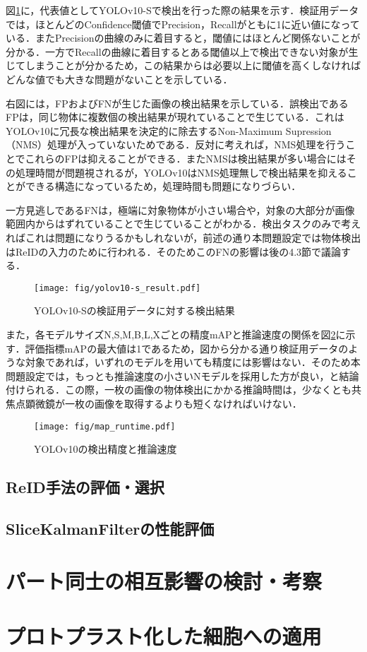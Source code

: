     図\ref{fig:metrics_yolo}に，代表値としてYOLOv10-Sで検出を行った際の結果を示す．検証用データでは，ほとんどのConfidence閾値でPrecision，Recallがともに1に近い値になっている．またPrecisionの曲線のみに着目すると，閾値にはほとんど関係ないことが分かる．一方でRecallの曲線に着目するとある閾値以上で検出できない対象が生じてしまうことが分かるため，この結果からは必要以上に閾値を高くしなければどんな値でも大きな問題がないことを示している．

    右図には，FPおよびFNが生じた画像の検出結果を示している．誤検出であるFPは，同じ物体に複数個の検出結果が現れていることで生じている．これはYOLOv10に冗長な検出結果を決定的に除去するNon-Maximum Supression（NMS）処理が入っていないためである．反対に考えれば，NMS処理を行うことでこれらのFPは抑えることができる．またNMSは検出結果が多い場合にはその処理時間が問題視されるが，YOLOv10はNMS処理無しで検出結果を抑えることができる構造になっているため，処理時間も問題になりづらい．

    一方見逃しであるFNは，極端に対象物体が小さい場合や，対象の大部分が画像範囲内からはずれていることで生じていることがわかる．検出タスクのみで考えればこれは問題になりうるかもしれないが，前述の通り本問題設定では物体検出はReIDの入力のために行われる．そのためこのFNの影響は後の4.3節で議論する．

    \begin{figure}[t]
        \centering
        \texttt{[image: fig/yolov10-s\_result.pdf]}
        \caption[YOLOv10-Sの検証用データに対する検出結果]{YOLOv10-Sの検証用データに対する検出結果}
        \label{fig:metrics_yolo}
    \end{figure}

    また，各モデルサイズN,S,M,B,L,Xごとの精度mAPと推論速度の関係を図\ref{fig:map_runtime}に示す．評価指標mAPの最大値は1であるため，図から分かる通り検証用データのような対象であれば，いずれのモデルを用いても精度には影響はない．そのため本問題設定では，もっとも推論速度の小さいNモデルを採用した方が良い，と結論付けられる．この際，一枚の画像の物体検出にかかる推論時間は，少なくとも共焦点顕微鏡が一枚の画像を取得するよりも短くなければいけない．

    \begin{figure}[t]
        \centering
        \texttt{[image: fig/map\_runtime.pdf]}
        \caption[YOLOv10の検出精度と推論速度]{YOLOv10の検出精度と推論速度}
        \label{fig:map_runtime}
    \end{figure}

    \subsection{ReID手法の評価・選択}

    

    \subsection{SliceKalmanFilterの性能評価}

\section{パート同士の相互影響の検討・考察}

\section{プロトプラスト化した細胞への適用}